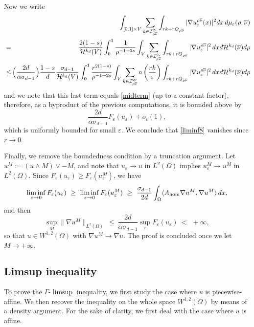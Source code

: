 \documentclass[11pt,a4paper,reqno]{amsart}
\theoremstyle{plain}
\theoremstyle{definition}
\newcommand\e{\varepsilon}
\theoremstyle{remark}
\begin{document}
Now we write
\begin{eqnarray} && \nonumber \hskip-1cm \nonumber \int_{[0,1]\times V} \sum_{k\in \mathcal{I}^{2r}_{\rho\overline{\nu}}}\int_{rk+rQ_{\rho\overline{\nu}}} |\nabla u_\e^{\rho\overline{\nu}}(x)|^2 dx\, d\mu_\e(\rho,\overline{\nu})
\\ \nonumber
&=& \frac{2(1-s)}{\mathcal{H}^{k_d}(V)} \int_0^1  \frac{1}{\rho^{-1+2s}}\int_V \sum_{k\in \mathcal{I}^{2r}_{{\rho\overline{\nu}}}} \int_{rk+rQ_{\rho\overline{\nu}}} |\nabla u_\e^{\rho\overline{\nu}}|^2\,dx   d\mathcal{H}^{k_d}(\overline{\nu}) d\rho \\ \nonumber
&\leq& \hskip-0.3cm \Bigl(\frac{2d}{\alpha\sigma_{d-1}}\Bigr)\frac{1-s}{d} \frac{\sigma_{d-1}}{\mathcal{H}^{k_d}(V)} \int_0^1  \frac{r^{2(1-s)}}{\rho^{-1+2s}}\int_V \sum_{k\in \mathcal{I}^{2r}_{{\rho\overline{\nu}}}} a\left(\frac{rk}{\e}\right) \int_{rk+rQ_{\rho\overline{\nu}}} |\nabla u_\e^{\rho\overline{\nu}}|^2\,dx   d\mathcal{H}^{k_d}(\overline{\nu})d\rho
\end{eqnarray}
and we note that this last term equals \eqref{midterm} (up to a constant factor), therefore, as a byproduct of the previous computations, it is bounded above by   
\[
\frac{2d}{\alpha\sigma_{d-1}}F_\e(u_\e)+o_\e(1),
\]
which is uniformly bounded for small $\e$. We conclude that \eqref{liminf8} vanishes since $r\to0$.



Finally, we remove the boundedness condition by a truncation argument. Let $u^M:= (u \land M) \lor -M$, and note that $u_\e\to u$ in $L^2(\Omega)$ implies $u_\e^M\to u^M$ in $L^2(\Omega)$. Since $F_\e(u_\e) \geq F_\e(u_\e^M)$, we have
\[
\liminf_{\e\to0} F_\e(u_\e) \  \geq \  \liminf_{\e\to0} F_\e(u^M_\e)\  \geq \ \frac{\sigma_{d-1}}{2d}\int_{\Omega} \langle A_{\rm hom}\nabla u^M, \nabla u^M\rangle\,dx,
\]
and then
\[
\sup_M \|\nabla u^M\|_{L^2(\Omega)} \  \leq \  \frac{2d}{\alpha\sigma_{d-1}}\sup_\e F_\e(u_\e)\  < \  \ +\infty,
\]
so that $u\in W^{1,2}(\Omega)$ with $\nabla u^M \to \nabla u$. The proof is concluded once we let $M\to+\infty$.

\subsection{\bf Limsup inequality}

To prove the $\Gamma$-$\limsup$ inequality, we first study the case where $u$ is piecewise-affine. We then recover the inequality on the whole space $W^{1,2}(\Omega)$ by means of a density argument. For the sake of clarity, we first deal with the case where $u$ is affine.
\end{document}

